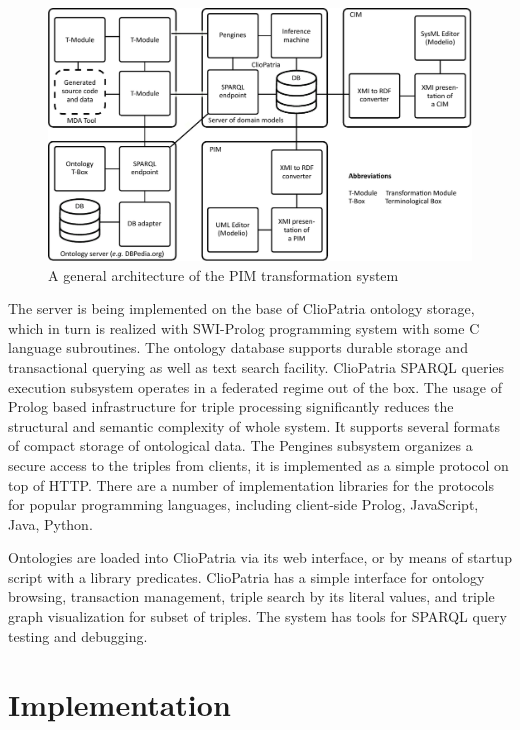 \documentclass[conference,a4paper]{IEEEtran}
\begin{document}
\begin{figure}[t]
  \centering
  \includegraphics[width=1\linewidth]{architecture-mda-lod-ext.pdf}
  \caption{A general architecture of the PIM transformation system}
  \label{fig:arch}
\end{figure}

The server is being implemented on the base of ClioPatria ontology storage, which in turn is realized with SWI-Prolog programming system with some C language subroutines.  The ontology database supports durable storage and transactional querying as well as text search facility.  ClioPatria SPARQL queries execution subsystem operates in a federated regime out of the box.  The usage of Prolog based infrastructure for triple processing significantly reduces the structural and semantic complexity of whole system. It supports several formats of compact storage of ontological data.  The Pengines subsystem organizes a secure access to the triples from clients, it is implemented as a simple protocol on top of HTTP.  There are a number of implementation libraries for the protocols for popular programming languages, including client-side Prolog, JavaScript, Java, Python.

Ontologies are loaded into ClioPatria via its web interface, or by means of startup script with a library predicates.  ClioPatria has a simple interface for ontology browsing, transaction management, triple search by its literal values, and triple graph visualization for subset of triples.  The system has tools for SPARQL query testing and debugging.

\section{Implementation}
\label{sec:impl}
\end{document}
